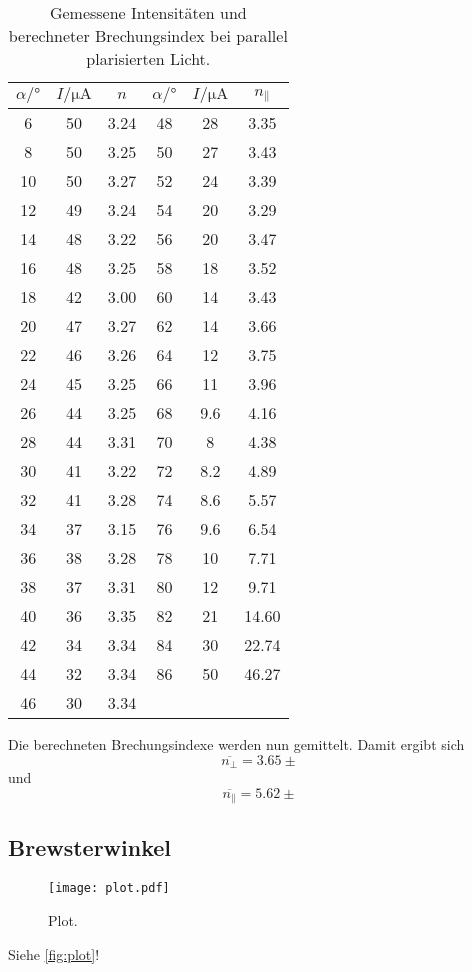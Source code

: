 \begin{table}[H]
  \centering
  \caption{Gemessene Intensitäten und berechneter Brechungsindex bei parallel plarisierten Licht.}
  \label{tab:para}
  \begin{tabular}{c c c c c c}
    \toprule
    $\alpha /°$ & $I / \unit{\micro\ampere}$ & $n$ & $\alpha /°$ & $I / \unit{\micro\ampere}$ & $n_\parallel$\\
    \midrule 
    6  &  50  & 3.24     & 48 &  28   &  3.35  \\ 
    8  &  50  & 3.25     & 50 &  27   &  3.43   \\
    10 &  50  & 3.27     & 52 &  24   &  3.39   \\
    12 &  49  & 3.24     & 54 &  20   &  3.29   \\
    14 &  48  & 3.22     & 56 &  20   &  3.47   \\
    16 &  48  & 3.25     & 58 &  18   &  3.52   \\
    18 &  42  & 3.00     & 60 &  14   &  3.43  \\
    20 &  47  & 3.27     & 62 &  14   &  3.66   \\
    22 &  46  & 3.26     & 64 &  12   &  3.75   \\
    24 &  45  & 3.25     & 66 &  11   &  3.96   \\
    26 &  44  & 3.25     & 68 &  9.6  &  4.16   \\
    28 &  44  & 3.31     & 70 &  8    &  4.38   \\
    30 &  41  & 3.22     & 72 &  8.2  &  4.89   \\
    32 &  41  & 3.28     & 74 &  8.6  &  5.57   \\
    34 &  37  & 3.15     & 76 &  9.6  &  6.54   \\
    36 &  38  & 3.28     & 78 &  10   &  7.71   \\
    38 &  37  & 3.31     & 80 &  12   &  9.71   \\
    40 &  36  & 3.35     & 82 &  21   &  14.60  \\
    42 &  34  & 3.34     & 84 &  30   &  22.74   \\
    44 &  32  & 3.34     & 86 &  50   &  46.27   \\
    46 &  30  & 3.34     &    &       &           \\
    \bottomrule
  \end{tabular}
\end{table}

\noindent Die berechneten Brechungsindexe werden nun gemittelt.
Damit ergibt sich 
\begin{equation*}
  \overline{n_\perp} = 3.65 \pm
\end{equation*}
und\begin{equation*}
  \overline{n_\parallel} = 5.62 \pm
\end{equation*}    

\subsection{Brewsterwinkel}
    








\begin{figure}
  \centering
  \texttt{[image: plot.pdf]}
  \caption{Plot.}
  \label{fig:plot}
\end{figure}


Siehe \autoref{fig:plot}!
